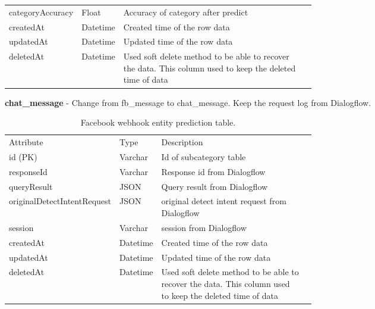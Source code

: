 \documentclass[12pt,oneside,openright,a4paper]{cpe-english-project}
\begin{document}
\begin{table}[ht]
\begin{adjustbox}{width=\textwidth}
\begin{tabular}{llp{0.6\linewidth}l}
\rowcolor[HTML]{DEEAF6} 
categoryAccuracy & Float & Accuracy of category after predict	\\
createdAt         & Datetime & Created time of the row data                                                                                \\
\rowcolor[HTML]{DEEAF6} 
updatedAt         & Datetime & Updated time of the row data                                                                              \\
deletedAt         & Datetime & Used soft delete method to be able to recover the data. This column   used to keep the deleted time of data
\end{tabular}
\end{adjustbox}
\end{table}

\pagebreak
\textbf{chat\_message} - Change from fb\_message to chat\_message. Keep the request log from Dialogflow.
\begin{table}[ht]
	\caption{Facebook webhook entity prediction table.}
	\label{tab:Facebook webhook entity prediction table.}
\begin{adjustbox}{width=\textwidth}
\begin{tabular}{llp{0.6\linewidth}l}
\rowcolor[HTML]{5B9BD5} 
Attribute & Type     & Description                                                                                                 \\
id (PK)   & Varchar  & Id of subcategory table                                                                                     \\
\rowcolor[HTML]{DEEAF6} 
responseId   & Varchar  & Response id from Dialogflow                                                                                   \\
queryResult   & JSON  & Query result from Dialogflow                                                                                   \\
\rowcolor[HTML]{DEEAF6} 
originalDetectIntentRequest   & JSON  & original detect intent request from Dialogflow                                                                                   \\
session   & Varchar  & session from Dialogflow                                                                                   \\
\rowcolor[HTML]{DEEAF6} 
createdAt & Datetime & Created time of the row data                                                                                \\
updatedAt & Datetime & Updated time of the row   data                                                                              \\
\rowcolor[HTML]{DEEAF6} 
deletedAt & Datetime & Used soft delete method to be able to recover the data. This column   used to keep the deleted time of data
\end{tabular}
\end{adjustbox}
\end{table}
\end{document}
